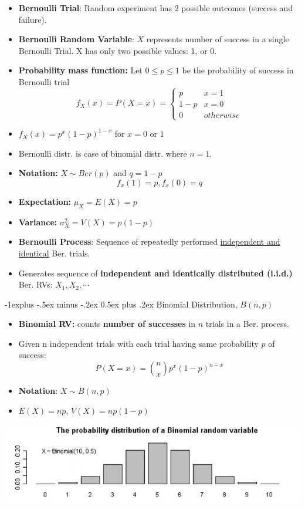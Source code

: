 \documentclass[12pt, landscape]{article}
\makeatletter
\renewcommand{\subsection}{\@startsection{subsection}{2}{0.1mm}%
                                {-1explus -.5ex minus -.2ex}%
                                {0.5ex plus .2ex}%
                                {\normalfont\normalsize\bfseries}}
\makeatother
\begin{document}
\begin{multicols*}{3}
\begin{itemize}
    \item \textbf{Bernoulli Trial}: Random experiment has 2 possible outcomes (success and failure).
    \item \textbf{Bernoulli Random Variable}: $X$ represents number of success in a single Bernoulli Trial. X has only two possible values: 1, or 0.
    \item \textbf{Probability mass function:} Let $0 \leq p \leq 1$ be the probability of success in Bernoulli trial
    \[ f_X (x) = P(X = x) = 
    \begin{cases}
        p & x = 1\\
        1 - p & x = 0\\
        0 & otherwise
    \end{cases}
    \]
    \item $f_X (x) = p^x (1-p)^{1-x}$ for $x=0$ or $1$
    \item Bernoulli distr. is case of binomial distr. where $n = 1$.
    \item \textbf{Notation:} $X \sim Ber(p)$ and $q = 1 - p$ \\
    \[ f_x(1) = p, f_x(0) = q \]
    \item \textbf{Expectation:} $\mu_X = E(X) = p$ 
    \item \textbf{Variance:} $\sigma_X^2 = V(X) = p(1-p)$
    
    \item \textbf{Bernoulli Process}: Sequence of repeatedly performed \underline{independent and identical} Ber. trials.
    \item Generates sequence of \textbf{independent and identically distributed (i.i.d.)} Ber. RVs: $X_1, X_2, \cdots$
\end{itemize}

\columnbreak

\subsection{Binomial Distribution, $B(n, p)$}
\begin{itemize}
    \item \textbf{Binomial RV:} counts \textbf{number of successes} in $n$ trials in a Ber. process.
    \item Given n independent trials with each trial having same probability $p$ of success: 
    \[P(X = x) = \binom{n}{x} p^x (1-p)^{n-x}\]
    \item \textbf{Notation}: $X \sim B(n, p)$
    \item $E(X) = np$, $V(X) = np(1-p)$
\end{itemize}
\medskip
\centerline{\includegraphics[width=1\linewidth]{binomial}}


\end{multicols*}
\end{document}
